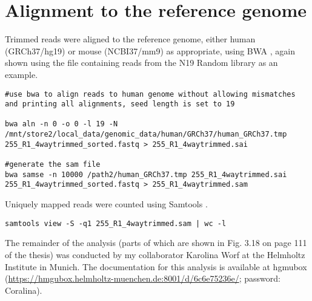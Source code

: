 \section{Alignment to the reference genome}
 
 Trimmed reads were aligned to the reference genome, either human (GRCh37/hg19) or mouse (NCBI37/mm9) as appropriate, using BWA \cite{Li:2009fi}, again shown using the file containing reads from the N19 Random library as an example.
 
\begin{small}\begin{lstlisting}
#use bwa to align reads to human genome without allowing mismatches and printing all alignments, seed length is set to 19

bwa aln -n 0 -o 0 -l 19 -N /mnt/store2/local_data/genomic_data/human/GRCh37/human_GRCh37.tmp 255_R1_4waytrimmed_sorted.fastq > 255_R1_4waytrimmed.sai

#generate the sam file
bwa samse -n 10000 /path2/human_GRCh37.tmp 255_R1_4waytrimmed.sai 255_R1_4waytrimmed_sorted.fastq > 255_R1_4waytrimmed.sam
 \end{lstlisting}\end{small}

Uniquely mapped reads were counted using Samtools \cite{Li:2009kaa}.

\begin{small}\begin{lstlisting}
samtools view -S -q1 255_R1_4waytrimmed.sam | wc -l
\end{lstlisting}\end{small}
 
The remainder of the analysis (parts of which are shown in Fig. 3.18 on page 111 of the thesis) was conducted by my collaborator Karolina Worf at the Helmholtz Institute in Munich. The documentation for this analysis is available at hgmubox (\url{https://hmgubox.helmholtz-muenchen.de:8001/d/6c6e75236e/}; password: Coralina). 

